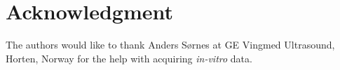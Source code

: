 \documentclass[journal]{IEEEtran}
\begin{document}

%





\section*{Acknowledgment}


The authors would like to thank Anders S\o{}rnes at GE Vingmed Ultrasound, Horten, Norway for the help with acquiring \textit{in-vitro} data.


\ifCLASSOPTIONcaptionsoff
  \newpage
\fi
\end{document}
